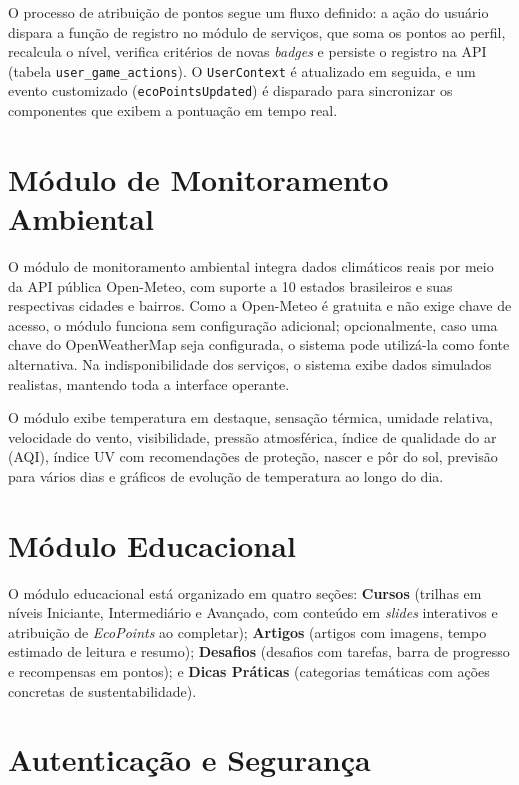 \documentclass[
	12pt,
	openright,
	oneside,
	a4paper,
	chapter=TITLE,
	section=TITLE,
	subsection=TITLE,
	subsubsection=TITLE,
	english,
	brazil
	]{abntex2}
\begin{document}
O processo de atribuição de pontos segue um fluxo definido: a ação do usuário dispara a função de registro no módulo de serviços, que soma os pontos ao perfil, recalcula o nível, verifica critérios de novas \textit{badges} e persiste o registro na API (tabela \texttt{user\_game\_actions}). O \texttt{UserContext} é atualizado em seguida, e um evento customizado (\texttt{ecoPointsUpdated}) é disparado para sincronizar os componentes que exibem a pontuação em tempo real.

\section{Módulo de Monitoramento Ambiental}

O módulo de monitoramento ambiental integra dados climáticos reais por meio da API pública Open-Meteo, com suporte a 10 estados brasileiros e suas respectivas cidades e bairros. Como a Open-Meteo é gratuita e não exige chave de acesso, o módulo funciona sem configuração adicional; opcionalmente, caso uma chave do OpenWeatherMap seja configurada, o sistema pode utilizá-la como fonte alternativa. Na indisponibilidade dos serviços, o sistema exibe dados simulados realistas, mantendo toda a interface operante.

O módulo exibe temperatura em destaque, sensação térmica, umidade relativa, velocidade do vento, visibilidade, pressão atmosférica, índice de qualidade do ar (AQI), índice UV com recomendações de proteção, nascer e pôr do sol, previsão para vários dias e gráficos de evolução de temperatura ao longo do dia.

\section{Módulo Educacional}

O módulo educacional está organizado em quatro seções: \textbf{Cursos} (trilhas em níveis Iniciante, Intermediário e Avançado, com conteúdo em \textit{slides} interativos e atribuição de \textit{EcoPoints} ao completar); \textbf{Artigos} (artigos com imagens, tempo estimado de leitura e resumo); \textbf{Desafios} (desafios com tarefas, barra de progresso e recompensas em pontos); e \textbf{Dicas Práticas} (categorias temáticas com ações concretas de sustentabilidade).

\section{Autenticação e Segurança}
\end{document}
